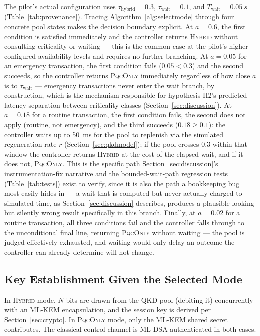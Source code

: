 \documentclass[journal]{IEEEtran}
\newcommand{\qkdavail}{\ensuremath{a}}
\begin{document}
The pilot's actual configuration uses $\tau_{\text{hybrid}} = 0.3$, $\tau_{\text{wait}} = 0.1$, and $T_{\text{wait}} = \qty{0.05}{s}$ (Table~\ref{tab:provenance}). Tracing Algorithm~\ref{alg:selectmode} through four concrete pool states makes the decision boundary explicit. At $\qkdavail = 0.6$, the first condition is satisfied immediately and the controller returns \textsc{Hybrid} without consulting criticality or waiting --- this is the common case at the pilot's higher configured availability levels and requires no further branching. At $\qkdavail = 0.05$ for an emergency transaction, the first condition fails ($0.05 < 0.3$) and the second succeeds, so the controller returns \textsc{PqcOnly} immediately regardless of how close $\qkdavail$ is to $\tau_{\text{wait}}$ --- emergency transactions never enter the wait branch, by construction, which is the mechanism responsible for hypothesis H2's predicted latency separation between criticality classes (Section~\ref{sec:discussion}). At $\qkdavail = 0.18$ for a routine transaction, the first condition fails, the second does not apply (routine, not emergency), and the third succeeds ($0.18 \geq 0.1$): the controller waits up to \qty{50}{ms} for the pool to replenish via the simulated regeneration rate $r$ (Section~\ref{sec:qkdmodel}); if the pool crosses $0.3$ within that window the controller returns \textsc{Hybrid} at the cost of the elapsed wait, and if it does not, \textsc{PqcOnly}. This is the specific path Section~\ref{sec:discussion}'s instrumentation-fix narrative and the bounded-wait-path regression tests (Table~\ref{tab:tests}) exist to verify, since it is also the path a bookkeeping bug most easily hides in --- a wait that is computed but never actually charged to simulated time, as Section~\ref{sec:discussion} describes, produces a plausible-looking but silently wrong result specifically in this branch. Finally, at $\qkdavail = 0.02$ for a routine transaction, all three conditions fail and the controller falls through to the unconditional final line, returning \textsc{PqcOnly} without waiting --- the pool is judged effectively exhausted, and waiting would only delay an outcome the controller can already determine will not change.

\subsection{Key Establishment Given the Selected Mode}
In \textsc{Hybrid} mode, $N$ bits are drawn from the QKD pool (debiting it) concurrently with an ML-KEM encapsulation, and the session key is derived per Section~\ref{sec:crypto}. In \textsc{PqcOnly} mode, only the ML-KEM shared secret contributes. The classical control channel is ML-DSA-authenticated in both cases.
\end{document}
